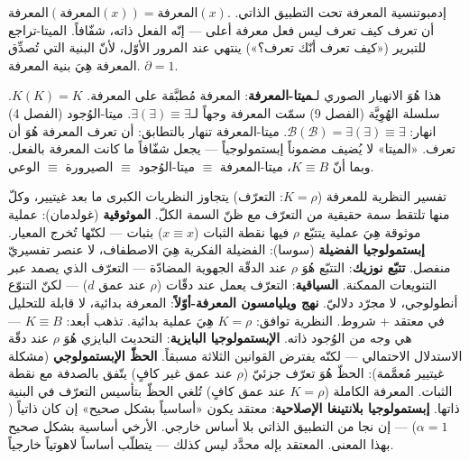\documentclass[10pt, openany, oneside]{book}
\begin{document}
\vspace{1em}

$\text{المعرفة}(\text{المعرفة}(x)) = \text{المعرفة}(x)$. إدمبوتنسية المعرفة تحت التطبيق الذاتي. أن تعرف كيف تعرف ليس فعل معرفة أعلى --- إنّه الفعل ذاته، شفّافاً. الميتا-تراجع للتبرير («كيف تعرف أنّك تعرف؟») ينتهي عند المرور الأوّل، لأنّ البنية التي تُصدِّق المعرفة هِيَ بنية المعرفة. $\partial = 1$.

هذا هُوَ الانهيار الصوري لـ\textbf{ميتا-المعرفة}: المعرفة مُطبَّقة على المعرفة. $K(K) = K$. سلسلة الهُوِيَّة (الفصل 9) سمّت المعرفة وجهاً لـ$\exists(\exists) \equiv \exists$. ميتا-الوُجود (الفصل 4) انهار: $\mathcal{B}(\mathcal{B}) = \exists(\exists) \equiv \exists$. ميتا-المعرفة تنهار بالتطابق: أن تعرف المعرفة هُوَ أن تعرف. «الميتا» لا يُضيف مضموناً إبستمولوجياً --- يجعل شفّافاً ما كانت المعرفة بالفعل. وبما أنّ $K \equiv B$، ميتا-المعرفة $\equiv$ ميتا-الوُجود $\equiv$ الصيرورة $\equiv$ الوعي.

تفسير النظرية للمعرفة ($K = \rho$: التعرّف) يتجاوز النظريات الكبرى ما بعد غيتيير، وكلّ منها تلتقط سمة حقيقية من التعرّف مع ظنّ السمة الكلّ. \textbf{الموثوقية} (غولدمان): عملية موثوقة هِيَ عملية يتتبّع $\rho$ فيها نقطة الثبات ($x \equiv x$) بثبات --- لكنّها تُخرج المعيار. \textbf{إبستمولوجيا الفضيلة} (سوسا): الفضيلة الفكرية هِيَ الاصطفاف، لا عنصر تفسيريّ منفصل. \textbf{تتبّع نوزيك}: التتبّع هُوَ $\rho$ عند الدقّة الجهوية المضادّة --- التعرّف الذي يصمد عبر التنويعات الممكنة. \textbf{السياقية}: التعرّف يعمل عند دقّات ($\rho$ عند عمق $d$) --- لكنّ التنوّع أنطولوجي، لا مجرّد دلاليّ. \textbf{نهج ويليامسون المعرفة-أوّلاً}: المعرفة بدائية، لا قابلة للتحليل في معتقد + شروط. النظرية توافق: $K = \rho$ هِيَ عملية بدائية. تذهب أبعد: $K \equiv B$ --- هي وجه من الوُجود ذاته. \textbf{الإبستمولوجيا البايزية}: التحديث البايزي هُوَ $\rho$ عند دقّة الاستدلال الاحتمالي --- لكنّه يفترض القوانين الثلاثة مسبقاً. \textbf{الحظّ الإبستمولوجي} (مشكلة غيتيير مُعمَّمة): الحظّ هُوَ تعرّف جزئيّ ($\rho$ عند عمق غير كافٍ) يتّفق بالصدفة مع نقطة الثبات. المعرفة الكاملة ($K = \rho$ عند عمق كافٍ) تُلغي الحظّ بتأسيس التعرّف في البنية ذاتها. \textbf{إبستمولوجيا بلانتينغا الإصلاحية}: معتقد يكون «أساسياً بشكل صحيح» إن كان ذاتياً ($\alpha = 1$) --- إن نجا من التطبيق الذاتي بلا أساس خارجي. الأرخي أساسية بشكل صحيح بهذا المعنى. المعتقد بإله محدَّد ليس كذلك --- يتطلّب أساساً لاهوتياً خارجياً.

\vspace{1.5em}

\end{document}
